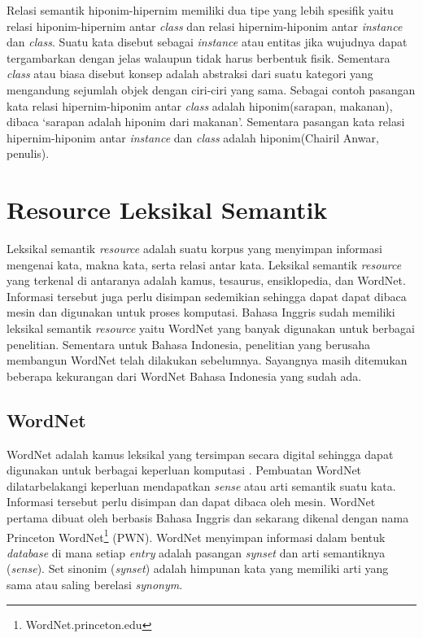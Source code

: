 Relasi semantik hiponim-hipernim memiliki dua tipe yang lebih spesifik yaitu relasi hiponim-hipernim antar \textit{class} dan relasi hipernim-hiponim antar \textit{instance} dan \textit{class}. Suatu kata disebut sebagai \textit{instance} atau entitas jika wujudnya dapat tergambarkan dengan jelas walaupun tidak harus berbentuk fisik. Sementara \textit{class} atau biasa disebut konsep adalah abstraksi dari suatu kategori yang mengandung sejumlah objek dengan ciri-ciri yang sama. Sebagai contoh pasangan kata relasi hipernim-hiponim antar \textit{class} adalah hiponim(sarapan, makanan), dibaca `sarapan adalah hiponim dari makanan'. Sementara pasangan kata relasi hipernim-hiponim antar \textit{instance} dan \textit{class} adalah hiponim(Chairil Anwar, penulis).


\section{Resource Leksikal Semantik}
Leksikal semantik \textit{resource} adalah suatu korpus yang menyimpan informasi mengenai kata, makna kata, serta relasi antar kata. Leksikal semantik \textit{resource} yang terkenal di antaranya adalah kamus, tesaurus, ensiklopedia, dan WordNet. Informasi tersebut juga perlu disimpan sedemikian sehingga dapat dapat dibaca mesin dan digunakan untuk proses komputasi. Bahasa Inggris sudah memiliki leksikal semantik \textit{resource} yaitu WordNet yang banyak digunakan untuk berbagai penelitian. Sementara untuk Bahasa Indonesia, penelitian yang berusaha membangun WordNet telah dilakukan sebelumnya. Sayangnya masih ditemukan beberapa kekurangan dari WordNet Bahasa Indonesia yang sudah ada. 

\subsection{WordNet}
WordNet adalah kamus leksikal yang tersimpan secara digital sehingga dapat digunakan untuk berbagai keperluan komputasi \citep{miller1995wordnet}. Pembuatan WordNet dilatarbelakangi keperluan mendapatkan \textit{sense} atau arti semantik suatu kata. Informasi tersebut perlu disimpan dan dapat dibaca oleh mesin. WordNet pertama dibuat oleh \cite{miller1995wordnet} berbasis Bahasa Inggris dan sekarang dikenal dengan nama Princeton WordNet\footnote{WordNet.princeton.edu} (PWN). WordNet menyimpan informasi dalam bentuk \textit{database} di mana setiap \textit{entry} adalah pasangan \textit{synset} dan arti semantiknya (\textit{sense}). Set sinonim (\textit{synset}) adalah himpunan kata yang memiliki arti yang sama atau saling berelasi \textit{synonym}. 

